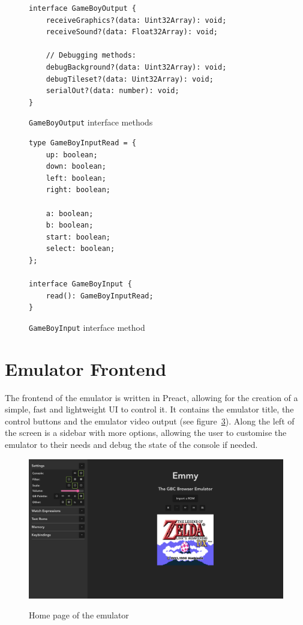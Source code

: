 \documentclass[11pt]{informatics-report}
\begin{document}
\begin{figure}[h]
    \begin{verbatim}
interface GameBoyOutput {
    receiveGraphics?(data: Uint32Array): void;
    receiveSound?(data: Float32Array): void;

    // Debugging methods:
    debugBackground?(data: Uint32Array): void;
    debugTileset?(data: Uint32Array): void;
    serialOut?(data: number): void;
}
    \end{verbatim}
    \caption{\texttt{GameBoyOutput} interface methods}
    \label{fig:gameboyoutput}
\end{figure}

\begin{figure}[h]
    \begin{verbatim}
type GameBoyInputRead = {
    up: boolean;
    down: boolean;
    left: boolean;
    right: boolean;

    a: boolean;
    b: boolean;
    start: boolean;
    select: boolean;
};

interface GameBoyInput {
    read(): GameBoyInputRead;
}
    \end{verbatim}
    \caption{\texttt{GameBoyInput} interface method}
    \label{fig:gameboyinput}
\end{figure}

\section{Emulator Frontend}

The frontend of the emulator is written in Preact, allowing for the creation of a simple, fast and lightweight UI to control it. It contains the emulator title, the control buttons and the emulator video output (see figure~\ref{fig:emmy-home}). Along the left of the screen is a sidebar with more options, allowing the user to customise the emulator to their needs and debug the state of the console if needed.

\begin{figure}[h]
    \centering
    \includegraphics[width=15cm]{images/emmy-home-page}\\
    \caption{Home page of the emulator}
    \label{fig:emmy-home}
\end{figure}
\end{document}
